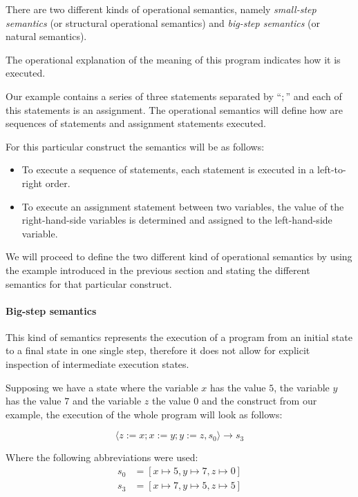 There are two different kinds of operational semantics, namely \textit{small-step semantics} (or structural operational semantics) and \textit{big-step semantics} (or natural semantics).

The operational explanation of the meaning of this program indicates how it is executed.

Our example contains a series of three statements separated by ``$;$'' and each of this statements is an assignment.
The operational semantics will define how are sequences of statements and assignment statements executed.

For this particular construct the semantics will be as follows:

\begin{itemize}
\item{To execute a sequence of statements, each statement is executed in a left-to-right order.}
\item{To execute an assignment statement between two variables, the value of the right-hand-side variables is determined and assigned to the left-hand-side variable.}
\end{itemize}


We will proceed to define the two different kind of operational semantics by using the example introduced in the previous section and stating the different semantics for that particular construct.

\paragraph{Big-step semantics}

This kind of semantics represents the execution of a program from an initial state to a final state in one single step, therefore it does not allow for explicit inspection of intermediate execution states.~\parencite{nipkow}

Supposing we have a state where the variable $x$ has the value $5$, the variable $y$ has the value $7$ and the variable $z$ the value $0$ and the construct from our example, the execution of the whole program will look as follows:

\begin{equation*}
\langle z:=x; x:=y; y:=z, s_{0} \rangle \rightarrow s_{3}
\end{equation*}

Where the following abbreviations were used:
\begin{align*}
s_{0} &= [x\mapsto5, y\mapsto7, z\mapsto0]\\
s_{3} &= [x\mapsto7, y\mapsto5, z\mapsto5]
\end{align*}


